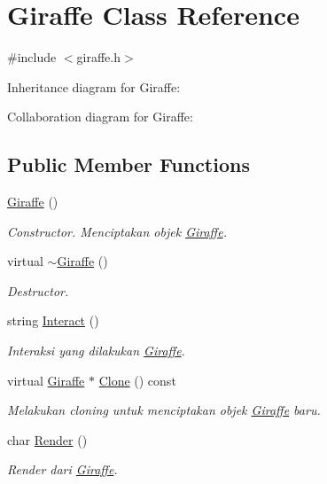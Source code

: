 \hypertarget{classGiraffe}{}\section{Giraffe Class Reference}
\label{classGiraffe}


{\ttfamily \#include $<$giraffe.\+h$>$}



Inheritance diagram for Giraffe\+:


Collaboration diagram for Giraffe\+:
\subsection*{Public Member Functions}
\begin{DoxyCompactItemize}
\item 
\hyperlink{classGiraffe_a4a396bd3e634243c1740916b71197168}{Giraffe} ()
\begin{DoxyCompactList}\small\item\em Constructor. Menciptakan objek \hyperlink{classGiraffe}{Giraffe}. \end{DoxyCompactList}\item 
virtual \hyperlink{classGiraffe_a1d099c4a2c87fbac26e5bcb33084dcb4}{$\sim$\+Giraffe} ()
\begin{DoxyCompactList}\small\item\em Destructor. \end{DoxyCompactList}\item 
string \hyperlink{classGiraffe_ad73e5ee5fc62f709c52a1cab68f2a1f3}{Interact} ()
\begin{DoxyCompactList}\small\item\em Interaksi yang dilakukan \hyperlink{classGiraffe}{Giraffe}. \end{DoxyCompactList}\item 
virtual \hyperlink{classGiraffe}{Giraffe} $\ast$ \hyperlink{classGiraffe_aa29f8f77477a64fc72f814b7f225c94f}{Clone} () const 
\begin{DoxyCompactList}\small\item\em Melakukan cloning untuk menciptakan objek \hyperlink{classGiraffe}{Giraffe} baru. \end{DoxyCompactList}\item 
char \hyperlink{classGiraffe_a64dccf030fdb54de9fd37f8381c64271}{Render} ()
\begin{DoxyCompactList}\small\item\em Render dari \hyperlink{classGiraffe}{Giraffe}. \end{DoxyCompactList}\end{DoxyCompactItemize}
